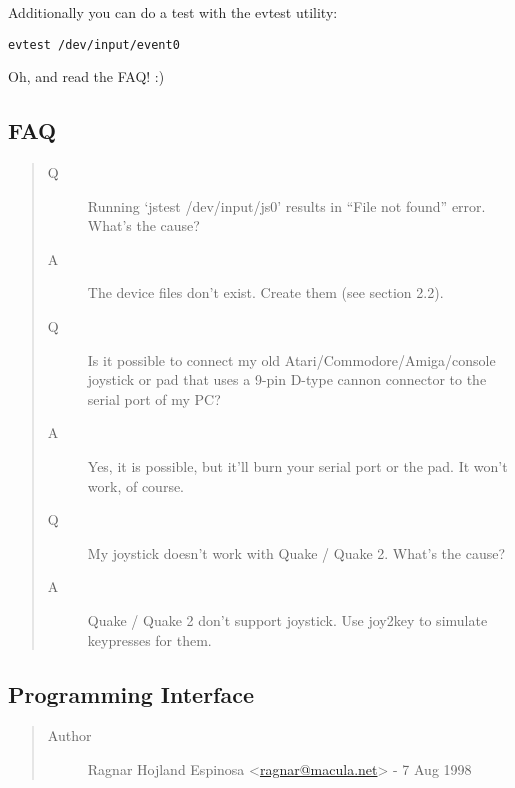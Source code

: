 \documentclass[a4paper,8pt,english]{sphinxmanual}
\begin{document}
Additionally you can do a test with the evtest utility:

\begin{Verbatim}[commandchars=\\\{\}]
evtest /dev/input/event0
\end{Verbatim}

Oh, and read the FAQ! :)


\subsection{FAQ}
\label{input/joydev/joystick:faq}\begin{quote}\begin{description}
\item[{Q}] \leavevmode
Running `jstest /dev/input/js0' results in ``File not found'' error. What's the
cause?

\item[{A}] \leavevmode
The device files don't exist. Create them (see section 2.2).

\item[{Q}] \leavevmode
Is it possible to connect my old Atari/Commodore/Amiga/console joystick
or pad that uses a 9-pin D-type cannon connector to the serial port of my
PC?

\item[{A}] \leavevmode
Yes, it is possible, but it'll burn your serial port or the pad. It
won't work, of course.

\item[{Q}] \leavevmode
My joystick doesn't work with Quake / Quake 2. What's the cause?

\item[{A}] \leavevmode
Quake / Quake 2 don't support joystick. Use joy2key to simulate keypresses
for them.

\end{description}\end{quote}


\subsection{Programming Interface}
\label{input/joydev/joystick-api:programming-interface}\label{input/joydev/joystick-api::doc}\label{input/joydev/joystick-api:joystick-api}\begin{quote}\begin{description}
\item[{Author}] \leavevmode
Ragnar Hojland Espinosa \textless{}\href{mailto:ragnar@macula.net}{ragnar@macula.net}\textgreater{} - 7 Aug 1998

\end{description}\end{quote}
\end{document}
